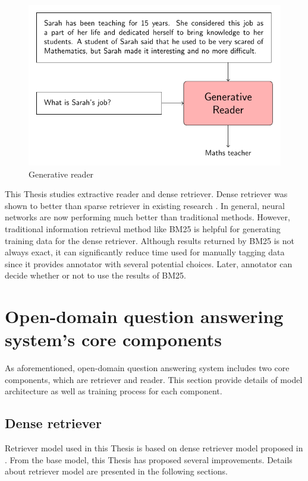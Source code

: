 \documentclass[3p, sort&compress, 12pt]{elsarticle}
\begin{document}
\begin{figure}
	\centering
	\includegraphics[scale=1.0]{images/PDF/generative_reader/generative_reader.pdf}
	\caption{Generative reader}
	\label{fig:03}
\end{figure}
This Thesis studies extractive reader and dense retriever. Dense retriever was shown to better than sparse retriever in existing research \cite{karpukhin2020dense}. In general, neural networks are now performing much better than traditional methods. However, traditional information retrieval method like BM25 is helpful for generating training data for the dense retriever. %
Although results returned by BM25 is not always exact, it can significantly reduce time used for manually tagging data since it provides annotator with several potential choices. Later, annotator can decide whether or not to use the results of BM25.
\section{Open-domain question answering system's core components}
As aforementioned, open-domain question answering system includes two core components, which are retriever and reader. This section provide details of model architecture as well as training process for each component.
\subsection{Dense retriever}
Retriever model used in this Thesis is based on dense retriever model proposed in \cite{karpukhin2020dense}. From the base model, this Thesis has proposed several improvements. Details about retriever model are presented in the following sections.
\end{document}
